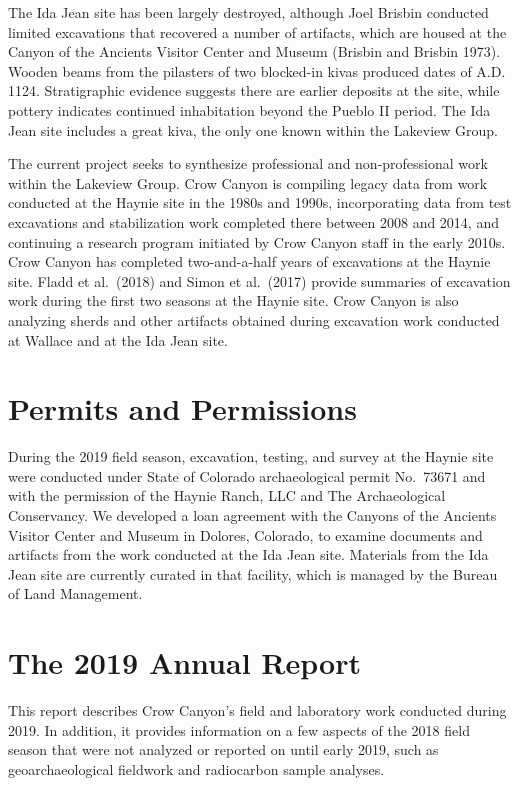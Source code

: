 \documentclass[
  12pt,
]{krantz}
\begin{document}
The Ida Jean site has been largely destroyed, although Joel Brisbin
conducted limited excavations that recovered a number of artifacts,
which are housed at the Canyon of the Ancients Visitor Center and Museum
(Brisbin and Brisbin 1973). Wooden beams from the pilasters of two
blocked-in kivas produced dates of A.D. 1124. Stratigraphic evidence
suggests there are earlier deposits at the site, while pottery indicates
continued inhabitation beyond the Pueblo II period. The Ida Jean site
includes a great kiva, the only one known within the Lakeview Group.

The current project seeks to synthesize professional and
non-professional work within the Lakeview Group. Crow Canyon is
compiling legacy data from work conducted at the Haynie site in the
1980s and 1990s, incorporating data from test excavations and
stabilization work completed there between 2008 and 2014, and continuing
a research program initiated by Crow Canyon staff in the early 2010s.
Crow Canyon has completed two-and-a-half years of excavations at the
Haynie site. Fladd et al.~(2018) and Simon et al.~(2017) provide
summaries of excavation work during the first two seasons at the Haynie
site. Crow Canyon is also analyzing sherds and other artifacts obtained
during excavation work conducted at Wallace and at the Ida Jean site.

\hypertarget{permits-and-permissions}{%
\section{Permits and Permissions}\label{permits-and-permissions}}

During the 2019 field season, excavation, testing, and survey at the
Haynie site were conducted under State of Colorado archaeological permit
No.~73671 and with the permission of the Haynie Ranch, LLC and The
Archaeological Conservancy. We developed a loan agreement with the
Canyons of the Ancients Visitor Center and Museum in Dolores, Colorado,
to examine documents and artifacts from the work conducted at the Ida
Jean site. Materials from the Ida Jean site are currently curated in
that facility, which is managed by the Bureau of Land Management.

\hypertarget{the-2019-annual-report}{%
\section{The 2019 Annual Report}\label{the-2019-annual-report}}

This report describes Crow Canyon's field and laboratory work conducted
during 2019. In addition, it provides information on a few aspects of
the 2018 field season that were not analyzed or reported on until early
2019, such as geoarchaeological fieldwork and radiocarbon sample
analyses.
\end{document}
